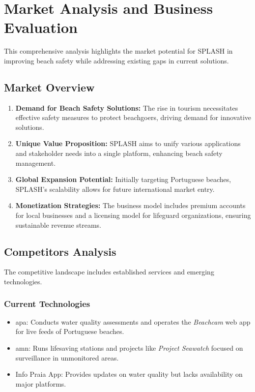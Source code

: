 \section{Market Analysis and Business Evaluation}
This comprehensive analysis highlights the market potential for SPLASH in improving beach safety while addressing existing gaps in current solutions.

\subsection{Market Overview}
\begin{enumerate}
    \item \textbf{Demand for Beach Safety Solutions:} The rise in tourism necessitates effective safety measures to protect beachgoers, driving demand for innovative solutions.
    \item \textbf{Unique Value Proposition:} SPLASH aims to unify various applications and stakeholder needs into a single platform, enhancing beach safety management.
    \item \textbf{Global Expansion Potential:} Initially targeting Portuguese beaches, SPLASH's scalability allows for future international market entry.
    \item \textbf{Monetization Strategies:} The business model includes premium accounts for local businesses and a licensing model for lifeguard organizations, ensuring sustainable revenue streams.
\end{enumerate}

\subsection{Competitors Analysis}
The competitive landscape includes established services and emerging technologies.

\subsubsection{Current Technologies}
\begin{itemize}
    \item \ac{apa}: Conducts water quality assessments and operates the \textit{Beachcam} web app for live feeds of Portuguese beaches.
    \item \ac{amn}: Runs lifesaving stations and projects like \textit{Project Seawatch} focused on surveillance in unmonitored areas.
    \item Info Praia App: Provides updates on water quality but lacks availability on major platforms.
\end{itemize}

